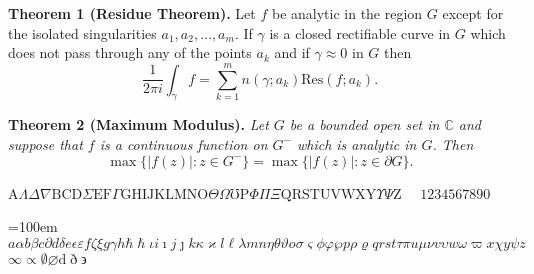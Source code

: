 \documentclass{article}
\begin{document}
  \textbf{Theorem 1 (Residue Theorem).}
  Let $f$ be analytic in the region $G$ except for the isolated singularities $a_1,a_2,\ldots,a_m$. If $\gamma$ is a closed rectifiable curve in $G$ which does not pass through any of the points $a_k$ and if $\gamma\approx 0$ in $G$ then
  \[
  \frac{1}{2\pi i}\int_\gamma f = \sum_{k=1}^m n(\gamma;a_k) \text{Res}(f;a_k).
  \]

  \textbf{Theorem 2 (Maximum Modulus).}
  \emph{Let $G$ be a bounded open set in $\mathbb{C}$ and suppose that $f$ is a continuous function on $G^-$ which is analytic in $G$. Then}
  \[
  \max\{|f(z)|:z\in G^-\}=\max \{|f(z)|:z\in \partial G \}.
  \]
  \vspace*{-1em}

  \newcommand{\abc}{abcdefghijklmnopqrstuvwxyz}
  \newcommand{\ABC}{ABCDEFGHIJKLMNOPQRSTUVWXYZ}
  \newcommand{\alphabeta}{\alpha\beta\gamma\delta\epsilon\varepsilon\zeta\eta\theta\vartheta\iota\kappa\varkappa\lambda\mu\nu\xi o\pi\varpi\rho\varrho\sigma\varsigma\tau\upsilon\phi\varphi\chi\psi\omega}
  \newcommand{\AlphaBeta}{\Gamma\Delta\Theta\Lambda\Xi\Pi\Sigma\Upsilon\Phi\Psi\Omega}




  $\mathrm{A} \Lambda \Delta \nabla \mathrm{B C D} \Sigma \mathrm{E F} \Gamma \mathrm{G H I J K L M N O} \Theta \Omega \mho \mathrm{P} \Phi \Pi \Xi \mathrm{Q R S T U V W X Y} \Upsilon \Psi \mathrm{Z} $  $ \quad 1234567890 $


  {\par {} \emergencystretch=100em $a\alpha b \beta c \partial d \delta e \epsilon \varepsilon f \zeta \xi g \gamma h \hbar \hslash \iota i \imath j \jmath k \kappa \varkappa l \ell \lambda m n \eta \theta \vartheta o \sigma \varsigma \phi \varphi \wp p \rho \varrho q r s t \tau \pi u \mu \nu v \upsilon w \omega \varpi x \chi y \psi z$ \linebreak[3] $\infty \propto \emptyset \varnothing \mathrm{d}\eth \backepsilon$\par}


\end{document}
